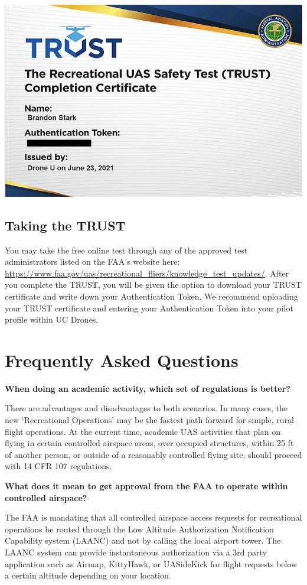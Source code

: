 \documentclass[
  12pt,
]{book}
\begin{document}
\begin{center}\includegraphics[width=0.5\linewidth]{images/TRUST_cert} \end{center}

\hypertarget{taking-the-trust}{%
\subsection{Taking the TRUST}\label{taking-the-trust}}

You may take the free online test through any of the approved test administrators listed on the FAA's website here: \url{https://www.faa.gov/uas/recreational_fliers/knowledge_test_updates/}. After you complete the TRUST, you will be given the option to download your TRUST certificate and write down your Authentication Token. We recommend uploading your TRUST certificate and entering your Authentication Token into your pilot profile within UC Drones.

\hypertarget{license-FAQ}{%
\section{Frequently Asked Questions}\label{license-FAQ}}

\textbf{When doing an academic activity, which set of regulations is better?}

There are advantages and disadvantages to both scenarios. In many cases, the new `Recreational Operations' may be the fastest path forward for simple, rural flight operations. At the current time, academic UAS activities that plan on flying in certain controlled airspace areas, over occupied structures, within 25 ft of another person, or outside of a reasonably controlled flying site, should proceed with 14 CFR 107 regulations.

\textbf{What does it mean to get approval from the FAA to operate within controlled airspace?}

The FAA is mandating that all controlled airspace access requests for recreational operations be routed through the Low Altitude Authorization Notification Capability system (LAANC) and not by calling the local airport tower. The LAANC system can provide instantaneous authorization via a 3rd party application such as Airmap, KittyHawk, or UASideKick for flight requests below a certain altitude depending on your location.
\end{document}

